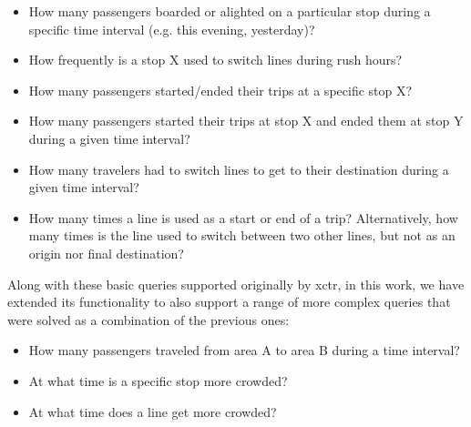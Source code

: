     \begin{itemize}
    \item How many passengers boarded or alighted on a particular stop during a specific time interval (e.g. this evening, yesterday)?
    \item How frequently is a stop X used to switch lines during rush hours?
    \item How many passengers started/ended their trips at a specific stop X?
    \item How many passengers started their trips at stop X and ended them at stop Y during a given time interval?
    \item How many travelers had to switch lines to get to their destination during a given time interval?
    \item How many times a line is used as a start or end of a trip? Alternatively, how many times is the line used to switch between two other lines, but not as an origin nor final destination?
    \end{itemize}
    
    Along with these basic queries supported originally by \gls{xctr}, in this work, we have extended its functionality to also support a range of more complex queries that were  solved as a combination of the previous ones:
    
    \begin{itemize}
        \item How many passengers traveled from area A to area B during a time interval? 
        \item At what time is a specific stop more crowded?
        \item At what time does a line get more crowded?
    \end{itemize}
    
